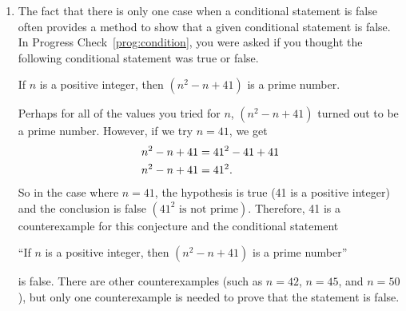 \begin{enumerate}
%

\item The fact that there is only one case when a conditional statement is false often provides a method to show that a given conditional statement is false.  In Progress Check~\ref{prog:condition}, you were asked if you thought the following conditional statement was true or false.
\begin{center}
If  $n$  is a positive integer, then  $\left( {n^2  - n + 41} \right)$ is a prime number.
\end{center}
Perhaps for all of the values you tried for  $n$, $\left( {n^2  - n + 41} \right)$ turned out to be a prime number.  However, if we try  $n = 41$, we get
\begin{align}
  n^2  - n + 41 &= 41^2  - 41 + 41 \notag \\ 
  n^2  - n + 41 &= 41^2 . \notag 
\end{align}
So in the case where  $n = 41$, the hypothesis is true  (41 is a positive integer) and the conclusion is false $\left( {41^2 \text{ is not prime}} \right)$.  Therefore, 41 is a counterexample for this conjecture and the conditional statement
\begin{center}
``If  $n$  is a positive integer, then  $\left( n^2  - n + 41 \right)$ is a prime number''
\end{center}
is false.  There are other counterexamples (such as $n = 42$, $n = 45$, and  $n = 50$), but only one counterexample is needed to prove that the statement is false.


\end{enumerate}
